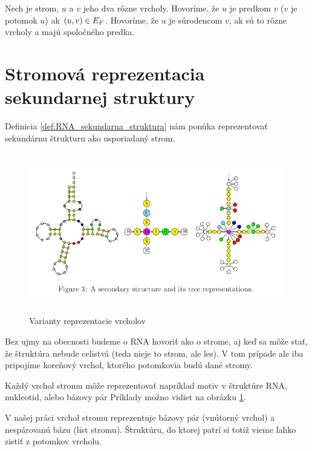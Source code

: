 \begin{definice}
  Nech  je strom, $u$ a $v$ jeho dva rôzne vrcholy.
  Hovoríme, že $u$ je predkom $v$ ($v$ je potomok $u$) ak $(u, v) \in E_{F}$.
  Hovoríme, že $u$ je súrodencom $v$, ak sú to rôzne vrcholy a majú spoločného predka.
\end{definice}



\section{Stromová reprezentacia sekundarnej struktury}

Definicia \ref{def:RNA_sekundarna_struktura} nám ponúka reprezentovať sekundárnu štrukturu
ako usporiadaný strom.

\begin{figure}[H]
\centering
\includegraphics[width=130mm, height=70mm]{../img/stromova_reprezentacia_rna.png}
\caption{Varianty reprezentacie vrcholov}
\label{obr:RNA_vrcholy}
\end{figure}

Bez ujmy na obecnosti budeme o RNA hovoriť ako o strome, aj keď sa môže stať, že
štruktúra nebude celistvá (teda nieje to strom, ale les). V tom prípade ale
iba pripojíme koreňový vrchol, ktorého potomkovia budú dané stromy.

Každý vrchol stromu môže reprezentovať napríklad motiv v štruktúre RNA, nukleotid, alebo bázovy pár
Príklady možno vidiet na obrázku \ref{obr:RNA_vrcholy}.

V našej práci vrchol stromu reprezentuje bázovy pár (vnútorný vrchol) a nespárovanú bázu (list stromu).
Štruktúru, do ktorej patrí si totiž vieme ľahko zistiť z potomkov vrcholu.






